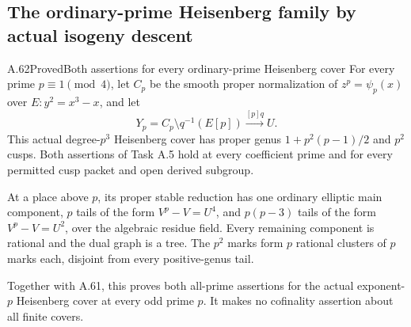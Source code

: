 \subsection{The ordinary-prime Heisenberg family by actual isogeny descent}

\begin{statement}{A.62}{Proved}{Both assertions for every ordinary-prime Heisenberg cover}
For every prime \(p\equiv1\pmod4\), let \(C_p\) be the smooth
proper normalization of \(z^p=\psi_p(x)\) over
\(E:y^2=x^3-x\), and let
\[
 Y_p=C_p\setminus q^{-1}(E[p])\xrightarrow{[p]q}U.
                                                        \tag{A.62.1}
\]
This actual degree-\(p^3\) Heisenberg cover has proper genus
\(1+p^2(p-1)/2\) and \(p^2\) cusps. Both assertions of
Task A.5 hold at every coefficient prime and for every
permitted cusp packet and open derived subgroup.

At a place above \(p\), its proper stable reduction has one
ordinary elliptic main component, \(p\) tails of the form
\(V^p-V=U^4\), and \(p(p-3)\) tails of the form
\(V^p-V=U^2\), over the algebraic residue field. Every
remaining component is rational and the dual graph is a tree.
The \(p^2\) marks form \(p\) rational clusters of \(p\)
marks each, disjoint from every positive-genus tail.

Together with A.61, this proves both all-prime assertions for
the actual exponent-\(p\) Heisenberg cover at every odd prime
\(p\). It makes no cofinality assertion about all finite covers.
\end{statement}


